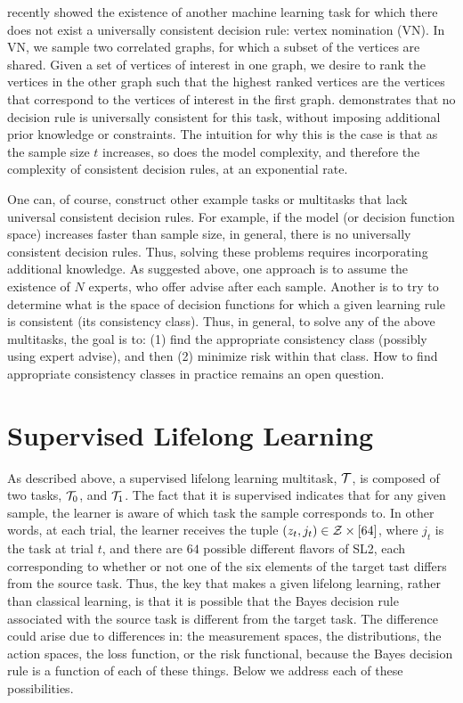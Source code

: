\documentclass{article}
\begin{document}
\citet{Lyzinski2017} recently showed the existence of another machine learning task for which there does not exist a universally consistent decision rule: vertex nomination (VN).  In VN, we sample two correlated graphs, for which a subset of the vertices are shared.  Given a set of vertices of interest in one graph, we desire to rank the vertices in the other graph such that the highest ranked vertices are the vertices that correspond to the vertices of interest in the first graph.  \citet{Lyzinski2017} demonstrates that no decision rule is universally consistent for this task, without imposing additional prior knowledge or constraints.   The intuition for why this is the case is that as the sample size $t$ increases, so does the model complexity, and therefore the complexity of consistent decision rules, at an exponential rate.


One can, of course, construct other example tasks or multitasks that lack universal consistent decision rules.  For example, if the model (or decision function space) increases faster than sample size, in general, there is no universally consistent decision rules.  Thus, solving these problems requires incorporating additional knowledge.  As suggested above, one approach is to assume the existence of $N$ experts, who offer advise after each sample.  Another is to try to determine what is the space of decision functions for which a given learning rule is consistent (its consistency class). 
Thus, in general, to solve any of the above multitasks, the goal is to: (1) find the appropriate consistency class (possibly using expert advise), and then (2) minimize risk within that class.  How to find appropriate consistency classes  in practice remains an open question.


\section{Supervised Lifelong Learning}
\label{sec:transfer}

As described above,  a supervised lifelong learning multitask, $\mathcal{T}$, is composed of two tasks, $\mathcal{T}_0$, and $\mathcal{T}_1$.  The fact that it is supervised indicates that for any given sample, the learner is aware of which task the sample corresponds to.  In other words, at each trial, the learner receives the tuple $(z_t, j_t) \in \mathcal{Z} \times [64]$, where $j_t$ is the task at trial $t$, and there are $64$ possible different flavors of SL2, each corresponding to whether or not one of the six elements of the target tast differs from the source task.    
Thus, the key that makes a given lifelong learning, rather than classical learning, is that it is possible that the Bayes decision rule associated with the source task is different from the target task.  The difference could arise due to differences in: the measurement spaces, the distributions, the action spaces, the loss function, or the risk functional, because the Bayes decision rule is a function of each of these things.  Below we address each of these possibilities.
\end{document}
